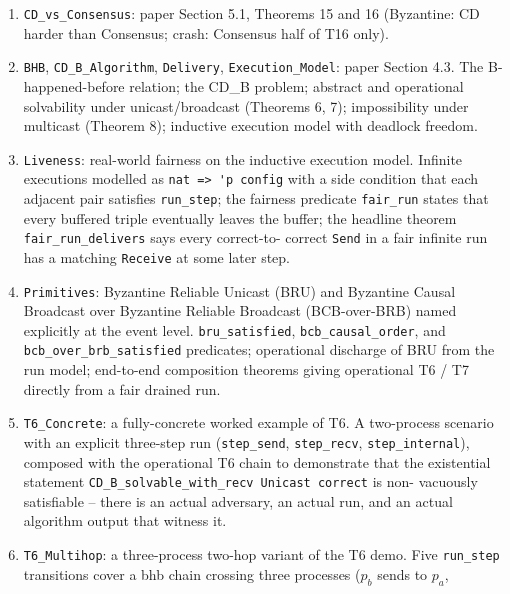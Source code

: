 \documentclass[11pt,a4paper]{article}
\begin{document}
\begin{enumerate}
        documenting why the abstract \verb|solves_Consensus|
        predicate is too weak to express FLP, and motivating the
        FLP-style chain used by \verb|Impossibility|.
  \item \verb|CD_vs_Consensus|: paper Section 5.1, Theorems 15
        and 16 (Byzantine: CD harder than Consensus; crash:
        Consensus half of T16 only).
  \item \verb|BHB|, \verb|CD_B_Algorithm|, \verb|Delivery|,
        \verb|Execution_Model|: paper Section 4.3.  The
        B-happened-before relation; the CD\_B problem; abstract
        and operational solvability under unicast/broadcast
        (Theorems 6, 7); impossibility under multicast (Theorem
        8); inductive execution model with deadlock freedom.
  \item \verb|Liveness|: real-world fairness on the inductive
        execution model.  Infinite executions modelled as
        \verb|nat => 'p config| with a side condition that each
        adjacent pair satisfies \verb|run_step|; the fairness
        predicate \verb|fair_run| states that every buffered
        triple eventually leaves the buffer; the headline
        theorem \verb|fair_run_delivers| says every correct-to-
        correct \verb|Send| in a fair infinite run has a matching
        \verb|Receive| at some later step.
  \item \verb|Primitives|: Byzantine Reliable Unicast (BRU) and
        Byzantine Causal Broadcast over Byzantine Reliable
        Broadcast (BCB-over-BRB) named explicitly at the event
        level.  \verb|bru_satisfied|, \verb|bcb_causal_order|,
        and \verb|bcb_over_brb_satisfied| predicates; operational
        discharge of BRU from the run model; end-to-end
        composition theorems giving operational T6 / T7 directly
        from a fair drained run.
  \item \verb|T6_Concrete|: a fully-concrete worked example of
        T6.  A two-process scenario with an explicit three-step
        run (\verb|step_send|, \verb|step_recv|,
        \verb|step_internal|), composed with the operational T6
        chain to demonstrate that the existential statement
        \verb|CD_B_solvable_with_recv Unicast correct| is non-
        vacuously satisfiable -- there is an actual adversary,
        an actual run, and an actual algorithm output that
        witness it.
  \item \verb|T6_Multihop|: a three-process two-hop variant of
        the T6 demo.  Five \verb|run_step| transitions cover a
        bhb chain crossing three processes ($p_b$ sends to $p_a$,

\end{enumerate}
\end{document}
